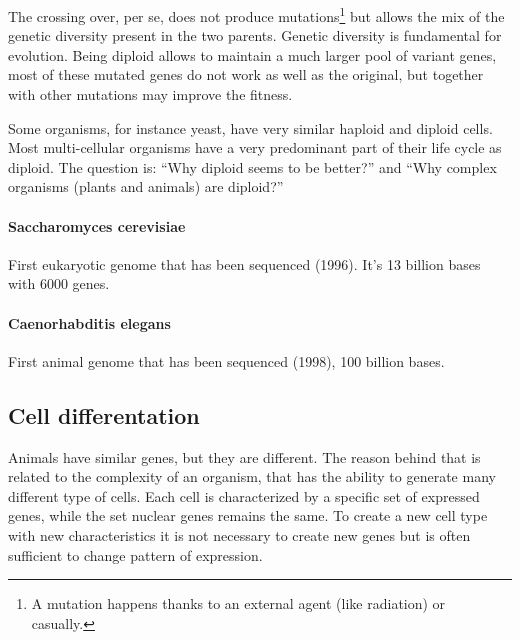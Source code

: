 The crossing over, per se, does not produce mutations\footnote{A mutation
happens thanks to an external agent (like radiation) or casually.} but allows
the mix of the genetic diversity present in the two parents. Genetic diversity
is fundamental for evolution. Being diploid allows to maintain a much larger
pool of variant genes, most of these mutated genes do not work as well as the
original, but together with other mutations may improve the fitness.

Some organisms, for instance yeast, have very similar haploid and diploid
cells. Most multi-cellular organisms have a very predominant part of their life
cycle as diploid. The question is: ``Why diploid seems to be better?'' and ``Why
complex organisms (plants and animals) are diploid?''

\paragraph*{Saccharomyces cerevisiae}
First eukaryotic genome that has been sequenced (1996). It's 13 billion bases
with 6000 genes.

\paragraph*{Caenorhabditis elegans}
First animal genome that has been sequenced (1998), 100 billion bases.

\subsection{Cell differentation}

Animals have similar genes, but they are different. The reason behind that is
related to the complexity of an organism, that has the ability to generate many
different type of cells.
Each cell is characterized by a specific set of expressed genes, while the set
nuclear genes remains the same. To create a new cell type with new
characteristics it is not necessary to create new genes but is often sufficient
to change pattern of expression.
